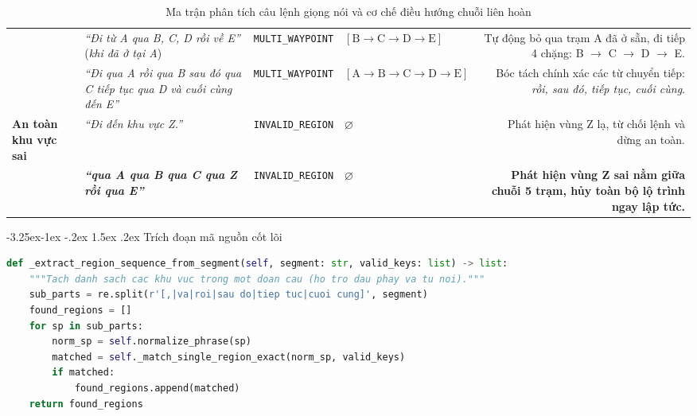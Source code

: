 \documentclass[11pt,a4paper]{article}
\makeatletter
\renewcommand{\subsection}{\@startsection{subsection}{2}{\z@}%
  {-3.25ex\@plus -1ex \@minus -.2ex}%
  {1.5ex \@plus .2ex}%
  {\normalfont\normalsize\bfseries\color{secondary}}}
\makeatother
\begin{document}
\begin{table}[H]
\begin{tabularx}{\textwidth}{L{2.5cm}L{4.2cm}L{2.8cm}L{2.2cm}R}
& \textit{``Đi từ A qua B, C, D rồi về E''} \newline(\textit{khi đã ở tại A}) & \texttt{MULTI\_WAYPOINT} & $[\text{B} \to \text{C} \to \text{D} \to \text{E}]$ & Tự động bỏ qua trạm A đã ở sẵn, đi tiếp 4 chặng: B $\to$ C $\to$ D $\to$ E. \\
& \textit{``Đi qua A rồi qua B sau đó qua C tiếp tục qua D và cuối cùng đến E''} & \texttt{MULTI\_WAYPOINT} & $[\text{A} \to \text{B} \to \text{C} \to \text{D} \to \text{E}]$ & Bóc tách chính xác các từ chuyển tiếp: \textit{rồi, sau đó, tiếp tục, cuối cùng}. \\
\midrule
\textbf{An toàn khu vực sai} & \textit{``Đi đến khu vực Z.''} & \texttt{INVALID\_REGION} & $\varnothing$ & Phát hiện vùng Z lạ, từ chối lệnh và dừng an toàn. \\
& \textbf{\textit{``qua A qua B qua C qua Z rồi qua E''}} & \texttt{INVALID\_REGION} & $\varnothing$ & \textbf{Phát hiện vùng Z sai nằm giữa chuỗi 5 trạm, hủy toàn bộ lộ trình ngay lập tức.} \\
\bottomrule
\end{tabularx}
\caption{Ma trận phân tích câu lệnh giọng nói và cơ chế điều hướng chuỗi liên hoàn}
\label{tab:commands}
\end{table}

\subsection{Trích đoạn mã nguồn cốt lõi}
\begin{lstlisting}[language=Python, caption={Thuật toán tách chặng chuỗi liên hoàn nhiều điểm dừng trong \texttt{voice\_navigation\_node.py}}]
def _extract_region_sequence_from_segment(self, segment: str, valid_keys: list) -> list:
    """Tach danh sach cac khu vuc trong mot doan cau (ho tro dau phay va tu noi)."""
    sub_parts = re.split(r'[,|va|roi|sau do|tiep tuc|cuoi cung]', segment)
    found_regions = []
    for sp in sub_parts:
        norm_sp = self.normalize_phrase(sp)
        matched = self._match_single_region_exact(norm_sp, valid_keys)
        if matched:
            found_regions.append(matched)
    return found_regions
\end{lstlisting}
\end{document}
